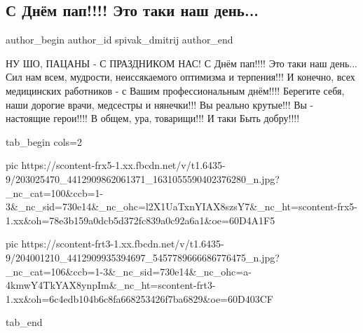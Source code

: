 
 
 
 
 
 
\subsection{С Днём пап!!!! Это таки наш день...}
\label{sec:20_06_2021.fb.spivak_dmitrij.1.den_pap_prazdnik}
\ifcmt
 author_begin
   author_id spivak_dmitrij
 author_end
\fi

\obeycr
НУ ШО, ПАЦАНЫ - С ПРАЗДНИКОМ НАС! 
С Днём пап!!!! Это таки наш день...
Сил нам всем, мудрости, неиссякаемого оптимизма и терпения!!! 
И конечно, всех медицинских работников - с Вашим профессиональным днём!!!! 
Берегите себя, наши дорогие врачи, медсестры и нянечки!!! 
Вы реально крутые!!! 
Вы - настоящие герои!!!! 
В общем, ура, товарищи!!! 
И таки Быть добру!!!!
\restorecr

\ifcmt
  tab_begin cols=2

     pic https://scontent-frx5-1.xx.fbcdn.net/v/t1.6435-9/203025470_4412909862061371_1631055590402376280_n.jpg?_nc_cat=100&ccb=1-3&_nc_sid=730e14&_nc_ohc=l2X1UaTxnYIAX8szsY7&_nc_ht=scontent-frx5-1.xx&oh=78e3b159a0dcb5d372fc839a0c92a6a1&oe=60D4A1F5

     pic https://scontent-frt3-1.xx.fbcdn.net/v/t1.6435-9/204001210_4412909935394697_5457789666686776475_n.jpg?_nc_cat=106&ccb=1-3&_nc_sid=730e14&_nc_ohc=a-4kmwY4TkYAX8ynpIm&_nc_ht=scontent-frt3-1.xx&oh=6c4edb104b6c8fa668253426f7ba6829&oe=60D403CF

  tab_end
\fi

